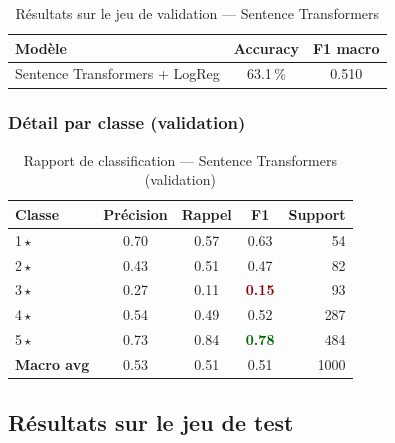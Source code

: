 \documentclass[12pt, a4paper]{article}
\begin{document}
\begin{table}[H]
  \centering
  \begin{tabular}{lcc}
    \toprule
    \textbf{Modèle} & \textbf{Accuracy} & \textbf{F1 macro} \\
    \midrule
    Sentence Transformers + LogReg & 63.1\,\% & 0.510 \\
    \bottomrule
  \end{tabular}
  \caption{Résultats sur le jeu de validation — Sentence Transformers}
\end{table}

\subsubsection{Détail par classe (validation)}

\begin{table}[H]
  \centering
  \begin{tabular}{lcccr}
    \toprule
    \textbf{Classe} & \textbf{Précision} & \textbf{Rappel} & \textbf{F1} & \textbf{Support} \\
    \midrule
    1\,$\star$ & 0.70 & 0.57 & 0.63 &  54 \\
    2\,$\star$ & 0.43 & 0.51 & 0.47 &  82 \\
    3\,$\star$ & 0.27 & 0.11 & \textcolor{darkred}{\textbf{0.15}} &  93 \\
    4\,$\star$ & 0.54 & 0.49 & 0.52 & 287 \\
    5\,$\star$ & 0.73 & 0.84 & \textcolor{darkgreen}{\textbf{0.78}} & 484 \\
    \midrule
    \textbf{Macro avg} & 0.53 & 0.51 & 0.51 & 1000 \\
    \bottomrule
  \end{tabular}
  \caption{Rapport de classification — Sentence Transformers (validation)}
\end{table}

\subsection{Résultats sur le jeu de test}
\end{document}
